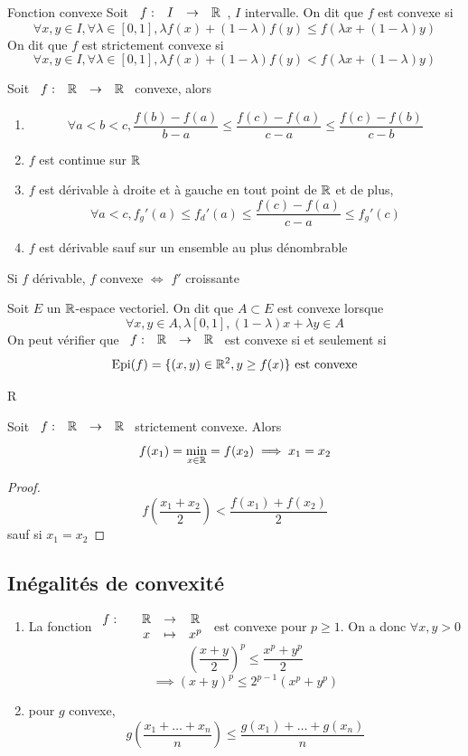 \documentclass[]{report}
\begin{document}
\begin{df}{Fonction convexe}{}
    Soit $\begin{array}{ccccc} f : & I & \to & \mathbb{R} \end{array}$, $I$ intervalle. On dit que $f$ est convexe si
    \[\forall x,y\in I,\forall \lambda\in [0,1], \lambda f(x)+(1-\lambda) f(y)\le f(\lambda x+(1-\lambda) y)\]
    On dit que $f$ est strictement convexe si
    \[\forall x,y\in I,\forall \lambda\in [0,1], \lambda f(x)+(1-\lambda) f(y)< f(\lambda x+(1-\lambda) y)\]
\end{df}

\begin{prop}{}{}
    Soit $\begin{array}{ccccc} f : & \mathbb{R} & \to & \mathbb{R} \end{array}$ convexe, alors
    \begin{enumerate}
        \item \[\forall a<b<c, \frac{f(b)-f(a)}{b-a}\le \frac{f(c)-f(a)}{c-a}\le \frac{f(c)-f(b)}{c-b}\]
        \item $f$ est continue sur $\mathbb{R}$
        \item $f$ est dérivable à droite et à gauche en tout point de $\mathbb{R}$ et de plus,
        \[\forall a<c,f_g'(a)\le f_d'(a)\le \frac{f(c)-f(a)}{c-a}\le f_g'(c)\]
        \item $f$ est dérivable sauf sur un ensemble au plus dénombrable
    \end{enumerate}
\end{prop}

\begin{prop}{}{}
    Si $f$ dérivable, $f$ convexe $\iff $ $f'$ croissante
\end{prop}

\begin{df}{}{}
    Soit $E$ un $\mathbb{R}$-espace vectoriel. On dit que $A\subset E$ est convexe lorsque
    \[\forall x,y\in A, \lambda [0,1], (1-\lambda)x+\lambda y\in A\]
    On peut vérifier que $\begin{array}{ccccc} f : & \mathbb{R} & \to & \mathbb{R} \end{array}$ est convexe si et seulement si
    \[\text{Epi}(f)=\{(x,y)\in \mathbb{R}^2,y\ge f(x)\}\text{ est convexe}\]
\end{df}R

\begin{prop}{}{}
    Soit $\begin{array}{ccccc} f : & \mathbb{R} & \to & \mathbb{R} \end{array}$ strictement convexe. Alors
    \[f(x_1)=\min_{x\in \mathbb{R}}=f(x_2)\implies x_1=x_2\]
\end{prop}

\begin{proof}
    \[f\left(\frac{x_1+x_2}{2}\right)<\frac{f(x_1)+f(x_2)}{2}\]
    sauf si $x_1=x_2$
\end{proof}

\subsection*{Inégalités de convexité}
\begin{enumerate}
\item La fonction $\begin{array}{ccccc} f : & & \mathbb{R} & \to & \mathbb{R} \\ & & x & \mapsto & x^p \end{array}$ est convexe pour $p \ge 1$. On a donc $\forall x,y>0$
\[\left(\frac{x+y}{2}\right)^p\le \frac{x^p+y^p}{2}\]
\[\implies \left(x+y\right)^p\le 2^{p-1} \left(x^p+y^p\right)\]
\item pour $g$ convexe,
\[ g\left(\frac{x_1+\ldots+x_n}{n}\right)\le \frac{g(x_1)+\ldots+g(x_n)}{n}\]
\end{enumerate}
\end{document}
